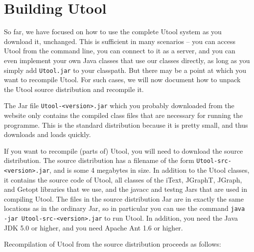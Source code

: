 \section{Building Utool} \label{sec:building}

So far, we have focused on how to use the complete Utool system as you
download it, unchanged. This is sufficient in many scenarios -- you
can access Utool from the command line, you can connect to it as a
server, and you can even implement your own Java classes that use our
classes directly, as long as you simply add \verb?Utool.jar? to your
classpath. But there may be a point at which you want to recompile
Utool. For such cases, we will now document how to unpack the Utool
source distribution and recompile it.

The Jar file \verb?Utool-<version>.jar? which you probably downloaded
from the website only contains the compiled class files that are
necessary for running the programme. This is the standard distribution
because it is pretty small, and thus downloads and loads quickly.

If you want to recompile (parts of) Utool, you will need to download
the source distribution. The source distribution has a filename of the
form \verb?Utool-src-<version>.jar?, and is some 4 megabytes in
size. In addition to the Utool classes, it contains the source code of
Utool, all classes of the iText, JGraphT, JGraph, and Getopt libraries
that we use, and the javacc and testng Jars that are used in compiling
Utool. The files in the source distribution Jar are in exactly the
same locations as in the ordinary Jar, so in particular you can use
the command \verb?java -jar Utool-src-<version>.jar? to run Utool. In
addition, you need the Java JDK 5.0 or higher, and you need Apache Ant
1.6 or higher.

Recompilation of Utool from the source distribution proceeds as
follows:

